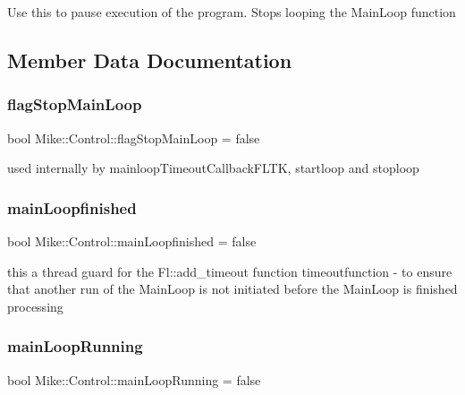 Use this to pause execution of the program. Stops looping the Main\+Loop function 

\subsection{Member Data Documentation}
\mbox{\label{class_mike_1_1_control_a800d1dc7b58dc3af7c081225009c898f}} 
\subsubsection{\texorpdfstring{flag\+Stop\+Main\+Loop}{flagStopMainLoop}}
{\footnotesize\ttfamily bool Mike\+::\+Control\+::flag\+Stop\+Main\+Loop = false\hspace{0.3cm}{\ttfamily [private]}}

used internally by mainloop\+Timeout\+Callback\+F\+L\+TK, startloop and stoploop \mbox{\label{class_mike_1_1_control_a7749b97976e1bb3e7ea49c7d63531dfc}} 
\subsubsection{\texorpdfstring{main\+Loopfinished}{mainLoopfinished}}
{\footnotesize\ttfamily bool Mike\+::\+Control\+::main\+Loopfinished = false\hspace{0.3cm}{\ttfamily [private]}}

this a \textquotesingle{}thread guard\textquotesingle{} for the Fl\+::add\+\_\+timeout function timeoutfunction -\/ to ensure that another run of the Main\+Loop is not initiated before the Main\+Loop is finished processing \mbox{\label{class_mike_1_1_control_af17a58f80bda54fda5b0a5167c8f04ed}} 
\subsubsection{\texorpdfstring{main\+Loop\+Running}{mainLoopRunning}}
{\footnotesize\ttfamily bool Mike\+::\+Control\+::main\+Loop\+Running = false\hspace{0.3cm}{\ttfamily [private]}}

